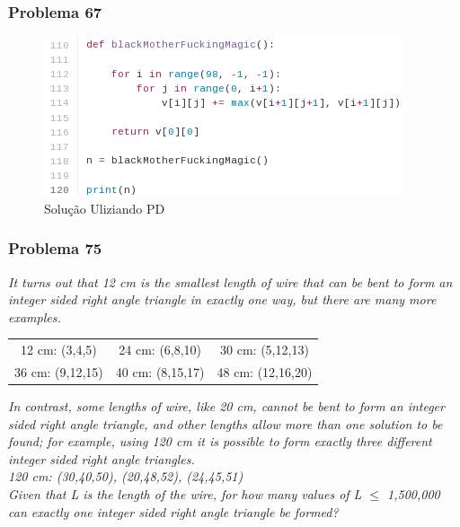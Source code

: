 \documentclass{beamer}
\begin{document}
\begin{frame}
    \frametitle{Problema 67}

    \begin{figure}[htpb]
        \centering
        \includegraphics[width=0.8\linewidth]{images/prob67.png}
        \caption{Solução Uliziando PD}
    \end{figure}

\end{frame}

\begin{frame}
    \frametitle{Problema 75}

    \begin{center}
        \textit{
            \small It turns out that 12 cm is the smallest length of wire that can be bent to form an integer sided right angle triangle in exactly one way, but there are many more examples.\\
        }
        \begin{table}[htpb]
            \centering
            \begin{tabular}{c c c}
                12 cm: (3,4,5)   & 24 cm: (6,8,10)  & 30 cm: (5,12,13)\\
                36 cm: (9,12,15) & 40 cm: (8,15,17) & 48 cm: (12,16,20)\\
            \end{tabular}
        \end{table}
        \textit{
            \small In contrast, some lengths of wire, like 20 cm, cannot be bent to form an integer sided right angle triangle, and other lengths allow more than one solution to be found; for example, using 120 cm it is possible to form exactly three different integer sided right angle triangles.\\
        }
        \textit{
            120 cm: (30,40,50), (20,48,52), (24,45,51)\\
        }
        \textit{
            \small Given that L is the length of the wire, for how many values of L $\leq$ 1,500,000 can exactly one integer sided right angle triangle be formed?\\
        }
    \end{center}
\end{frame}
\end{document}
